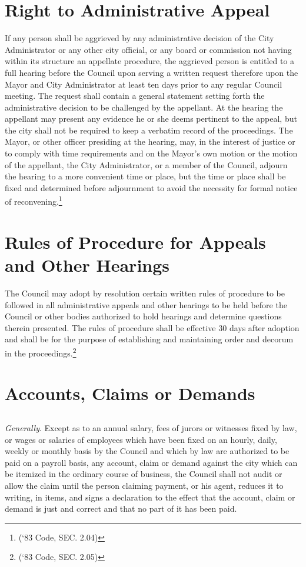 \section{Right to Administrative Appeal}
If any person shall be aggrieved by any administrative decision of the City Administrator or any other city official, or any board or commission not having within its structure an appellate procedure, the aggrieved person is entitled to a full hearing before the Council upon serving a written request therefore upon the Mayor and City Administrator at least ten days prior to any regular Council meeting. The request shall contain a general statement setting forth the administrative decision to be challenged by the appellant. At the hearing the appellant may present any evidence he or she deems pertinent to the appeal, but the city shall not be required to keep a verbatim record of the proceedings. The Mayor, or other officer presiding at the hearing, may, in the interest of justice or to comply with time requirements and on the Mayor’s own motion or the motion of the appellant, the City Administrator, or a member of the Council, adjourn the hearing to a more convenient time or place, but the time or place shall be fixed and determined before adjournment to avoid the necessity for formal notice of reconvening.\footnote{(‘83 Code, SEC. 2.04)}



\section{Rules of Procedure for Appeals and Other Hearings}
The Council may adopt by resolution certain written rules of procedure to be followed in all administrative appeals and other hearings to be held before the Council or other bodies authorized to hold hearings and determine questions therein presented.  The rules of procedure shall be effective 30 days after adoption and shall be for the purpose of establishing and maintaining order and decorum in the proceedings.\footnote{(‘83 Code, SEC. 2.05)}



\section{Accounts, Claims or Demands}
\subsection{}
\emph{Generally}. Except as to an annual salary, fees of jurors or witnesses fixed by law, or wages or salaries of employees which have been fixed on an hourly, daily, weekly or monthly basis by the Council and which by law are authorized to be paid on a payroll basis, any account, claim or demand against the city which can be itemized in the ordinary course of business, the Council shall not audit or allow the claim until the person claiming payment, or his agent, reduces it to writing, in items, and signs a declaration to the effect that the account, claim or demand is just and correct and that no part of it has been paid.
